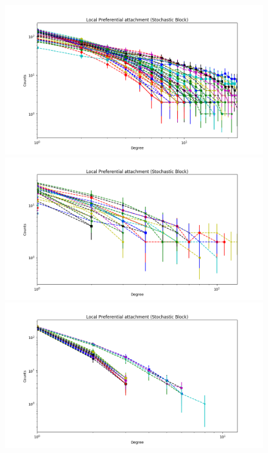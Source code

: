\documentclass[a4paper, 12pt]{article}
\begin{document}
\begin{figure}[ht]
	\endminipage
		\vspace{-0.29cm}
	\includegraphics[scale=0.27]{img/expe/4_mmsb/figure_2}
	\endminipage
	\includegraphics[scale=0.27]{img/expe/5_mmsb/figure_2} 
	\endminipage
	\includegraphics[scale=0.27]{img/expe/6_mmsb/figure_2}
	\endminipage
		\vspace{-0.28cm}

\end{figure}
\end{document}
